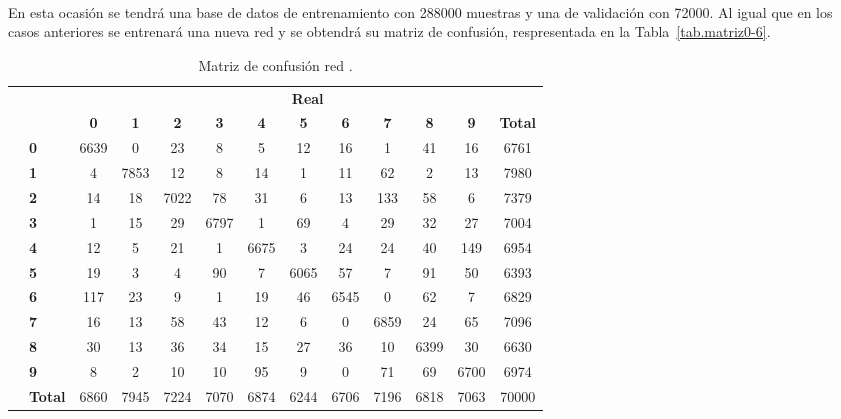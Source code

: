\begin{description}
	\\
	En esta ocasión se tendrá una base de datos de entrenamiento con 288000 muestras y una de validación con 72000. Al igual que en los casos anteriores se entrenará una nueva red y se obtendrá su matriz de confusión, respresentada en la Tabla~\ref{tab.matriz0-6}.
	\begin{table}[H]
		\centering
		\begin{tabular}{|c|l|c|c|c|c|c|c|c|c|c|c|c|}
			\cline{3-13} 
			\multicolumn{2}{c|}{} & \multicolumn{11}{c|}{\textbf{Real}} \\ \cline{3-13} 
			\multicolumn{2}{c|}{} & \textbf{0} & \textbf{1} & \textbf{2} &  \textbf{3} & \textbf{4} & \textbf{5} & \textbf{6} & \textbf{7} & \textbf{8} & \textbf{9} & \textbf{Total}\\ \hline
			\multirow{10}{0.5cm}{\rotatebox{90}{\textbf{Predicción}}}& \textbf{0} & \cellcolor{lightgray}6639 & 0 & 23 & 8 & 5 & 12 & 16 & 1 & 41 & 16 & 6761\\ \cline{2-13}
			& \textbf{1} & 4 & \cellcolor{lightgray}7853 & 12 & 8 & 14 & 1 & 11 & 62 & 2 & 13 & 7980\\ \cline{2-13}
			& \textbf{2} & 14 & 18 & \cellcolor{lightgray}7022 & 78 & 31 & 6 & 13 & 133 & 58 & 6 & 7379\\ \cline{2-13}
			& \textbf{3} & 1 & 15 & 29 & \cellcolor{lightgray}6797 & 1 & 69 & 4 & 29 & 32 & 27 & 7004\\ \cline{2-13}
			& \textbf{4} & 12 & 5 & 21 & 1 & \cellcolor{lightgray}6675 & 3 & 24 & 24 & 40 & 149 & 6954\\ \cline{2-13}
			& \textbf{5} & 19 & 3 & 4 & 90 & 7 & \cellcolor{lightgray}6065 & 57 & 7 & 91 & 50 & 6393\\ \cline{2-13}
			& \textbf{6} & 117 & 23 & 9 & 1 & 19 & 46 & \cellcolor{lightgray}6545 & 0 & 62 & 7 & 6829\\ \cline{2-13}
			& \textbf{7} & 16 & 13 & 58 & 43 & 12 & 6 & 0 & \cellcolor{lightgray}6859 & 24 & 65 & 7096\\ \cline{2-13}
			& \textbf{8} & 30 & 13 & 36 & 34 & 15 & 27 & 36 & 10 & \cellcolor{lightgray}6399 & 30 & 6630\\ \cline{2-13}
			& \textbf{9} & 8 & 2 & 10 & 10 & 95 & 9 & 0 & 71 & 69 & \cellcolor{lightgray}6700 & 6974\\ \cline{2-13}
			& \textbf{Total} & 6860 & 7945 & 7224 & 7070 & 6874 & 6244 & 6706 & 7196 & 6818 & 7063 & 70000\\ \hline
		\end{tabular}
		\caption{Matriz de confusión red .}

\end{table}
\end{description}
